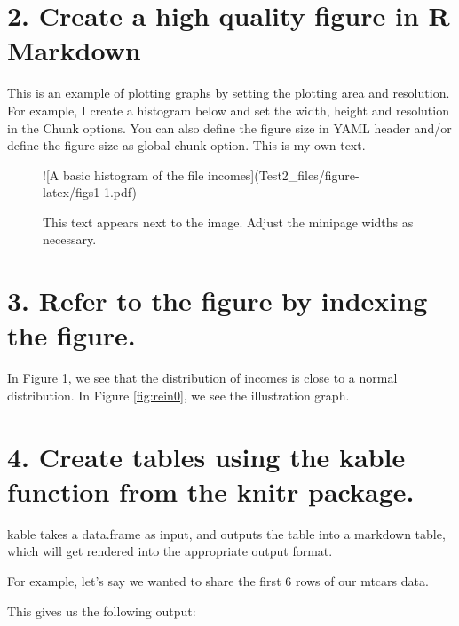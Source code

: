 \documentclass[
]{article}
\begin{document}
\section{2. Create a high quality figure in R
Markdown}\label{create-a-high-quality-figure-in-r-markdown}

This is an example of plotting graphs by setting the plotting area and
resolution. For example, I create a histogram below and set the width,
height and resolution in the Chunk options. You can also define the
figure size in YAML header and/or define the figure size as global chunk
option. This is my own text.

\begin{figure}[H]
  \centering
  \begin{minipage}{0.5\textwidth}
    ![\label{fig:figs1}A basic histogram of the file incomes](Test2_files/figure-latex/figs1-1.pdf) 
\end{minipage}%
  \begin{minipage}{0.5\textwidth}
    This text appears next to the image. Adjust the minipage widths as necessary.
  \end{minipage}
\end{figure}

\section{3. Refer to the figure by indexing the
figure.}\label{refer-to-the-figure-by-indexing-the-figure.}

In Figure \ref{fig:figs1}, we see that the distribution of incomes is
close to a normal distribution. In Figure \ref{fig:rein0}, we see the
illustration graph.

\section{4. Create tables using the kable function from the knitr
package.}\label{create-tables-using-the-kable-function-from-the-knitr-package.}

kable takes a data.frame as input, and outputs the table into a markdown
table, which will get rendered into the appropriate output format.

For example, let's say we wanted to share the first 6 rows of our mtcars
data.

This gives us the following output:
\end{document}
